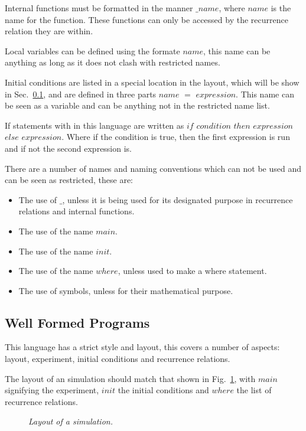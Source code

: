 \documentclass{article}
\begin{document}
Internal functions must be formatted in the manner $\_name$, where $name$ is the name for the function. These functions can only be accessed by the recurrence relation they are within. 

Local variables can be defined using the formate $name$, this name can be anything as long as it does not clash with restricted names. 

Initial conditions are listed in a special location in the layout, which will be show in Sec.~\ref{wellformedprogs}, and are defined in three parts $name$ $=$ $expression$. This name can be seen as a variable and can be anything not in the restricted name list. 

If statements with in this language are written as $if$ $condition$ $then$ $expression$ $else$ $expression$. Where if the condition is true, then the first expression is run and if not the second expression is.  

There are a number of names and naming conventions which can not be used and can be seen as restricted, these are:
\begin{itemize}
  \item The use of $\_$, unless it is being used for its designated purpose in recurrence relations and internal functions. 
  \item The use of the name $main$.
  \item The use of the name $init$.
  \item The use of the name $where$, unless used to make a where statement.
  \item The use of symbols, unless for their mathematical purpose.  
\end{itemize}


\subsection{Well Formed Programs} \label{wellformedprogs} 
This language has a strict style and layout, this covers a number of aspects: layout, experiment, initial conditions and recurrence relations.  

The layout of an simulation should match that shown in Fig.~\ref{fig:1exofla}, with $main$ signifying the experiment, $init$ the initial conditions and $where$ the list of recurrence relations. 
\begin{figure}[H]
	\centering
	
	\caption{\it Layout of a simulation.}
	\label{fig:1exofla}
\end{figure} 
\end{document}
